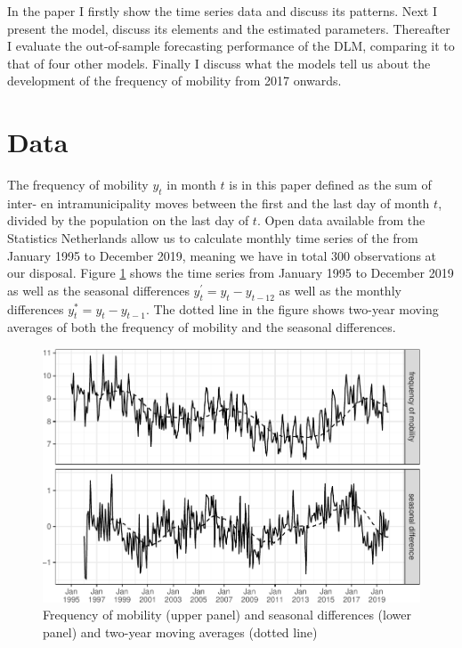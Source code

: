 \documentclass[]{article}
\begin{document}
In the paper I firstly show the time series data and discuss its
patterns. Next I present the model, discuss its elements and the
estimated parameters. Thereafter I evaluate the out-of-sample
forecasting performance of the DLM, comparing it to that of four other
models. Finally I discuss what the models tell us about the development
of the frequency of mobility from 2017 onwards.

\section{Data}\label{data}

The frequency of mobility \(y_{t}\) in month \(t\) is in this paper
defined as the sum of inter- en intramunicipality moves between the
first and the last day of month \(t\), divided by the population on the
last day of \(t\). Open data available from the Statistics Netherlands
allow us to calculate monthly time series of the from January 1995 to
December 2019, meaning we have in total 300 observations at our
disposal. Figure \ref{fig:freq-plot} shows the time series from January
1995 to December 2019 as well as the seasonal differences
\(y^{'}_{t} = y_{t} - y_{t-12}\) as well as the monthly differences
\(y^{*}_{t} = y_{t} - y_{t-1}\). The dotted line in the figure shows
two-year moving averages of both the frequency of mobility and the
seasonal differences.

\begin{figure}
\centering
\includegraphics{../figs/freq--freq-plot-1.pdf}
\caption{\label{fig:freq-plot}Frequency of mobility (upper panel) and
seasonal differences (lower panel) and two-year moving averages (dotted
line)}
\end{figure}
\end{document}
